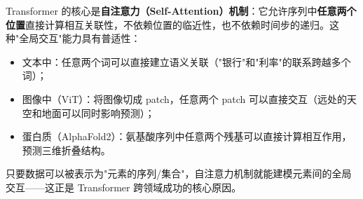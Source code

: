 \documentclass[a4paper,11pt]{ctexart}
\begin{document}
\begin{solutionbox}[参考答案与详细解析]
    Transformer 的核心是\textbf{自注意力（Self-Attention）机制}：它允许序列中\textbf{任意两个位置}直接计算相互关联性，不依赖位置的临近性，也不依赖时间步的递归。这种"全局交互"能力具有普适性：
    \begin{itemize}
        \item 文本中：任意两个词可以直接建立语义关联（"银行"和"利率"的联系跨越多个词）；
        \item 图像中（ViT）：将图像切成 patch，任意两个 patch 可以直接交互（远处的天空和地面可以同时影响预测）；
        \item 蛋白质（AlphaFold2）：氨基酸序列中任意两个残基可以直接计算相互作用，预测三维折叠结构。
    \end{itemize}
    只要数据可以被表示为"元素的序列/集合"，自注意力机制就能建模元素间的全局交互——这正是 Transformer 跨领域成功的核心原因。
\end{solutionbox}
\end{document}
